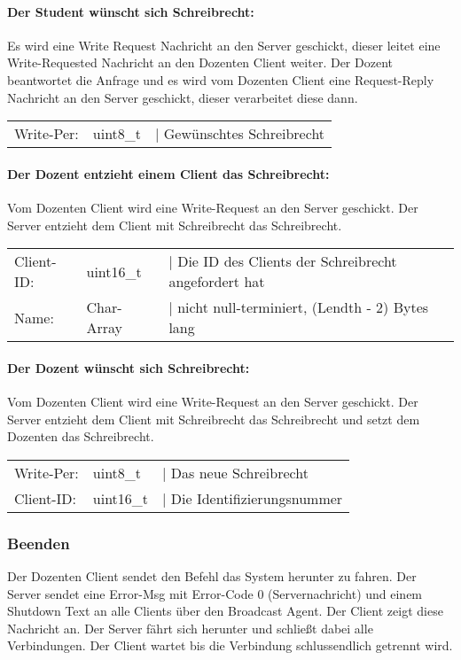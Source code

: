 \paragraph*{Der Student wünscht sich Schreibrecht: \\}
Es wird eine Write Request Nachricht an den Server geschickt, dieser leitet eine Write-Requested 
Nachricht an den Dozenten Client weiter. Der Dozent beantwortet die Anfrage und es wird vom Dozenten 
Client eine Request-Reply Nachricht an den Server geschickt, dieser verarbeitet diese dann.

\begin{tabular}{lll}
Write-Per: & uint8\_t & | Gewünschtes Schreibrecht
\end{tabular}

\paragraph*{Der Dozent entzieht einem Client das Schreibrecht: \\}
Vom Dozenten Client wird eine Write-Request an den Server geschickt. Der Server entzieht dem Client 
mit Schreibrecht das Schreibrecht.

\begin{tabular}{lll}
Client-ID: & uint16\_t & | Die ID des Clients der Schreibrecht angefordert hat \\
Name: & Char-Array & | nicht null-terminiert, (Lendth - 2) Bytes lang
\end{tabular}

\paragraph*{Der Dozent wünscht sich Schreibrecht: \\}
Vom Dozenten Client wird eine Write-Request an den Server geschickt. Der Server entzieht dem Client 
mit Schreibrecht das Schreibrecht und setzt dem Dozenten das Schreibrecht. 

\begin{tabular}{lll}
Write-Per: & uint8\_t & | Das neue Schreibrecht\\
Client-ID: & uint16\_t & | Die Identifizierungsnummer
\end{tabular}

\subsubsection{Beenden}
Der Dozenten Client sendet den Befehl das System herunter zu fahren. Der Server sendet eine Error-Msg 
mit Error-Code 0 (Servernachricht) und einem Shutdown Text an alle Clients über den Broadcast Agent. 
Der Client zeigt diese Nachricht an. Der Server fährt sich herunter und schließt dabei alle 
Verbindungen. Der Client wartet bis die Verbindung schlussendlich getrennt wird.

